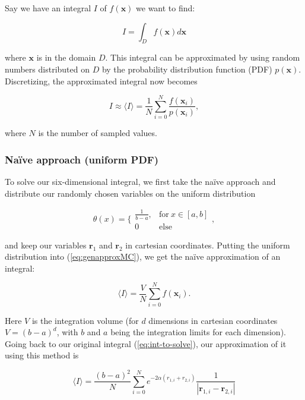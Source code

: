 \documentclass[../main.tex]{subfiles}
\begin{document}
Say we have an integral $I$ of $f(\mathbf x)$ we want to find:

\begin{equation*}
  I=\int_D f(\mathbf x)d\mathbf x
\end{equation*}

where $\mathbf{x}$ is in the domain $D$. This integral can be approximated by using random numbers distributed on $D$ by the probability distribution function (PDF) $p(\mathbf x)$. Discretizing, the approximated integral now becomes

\begin{equation}
  I \approx \langle I \rangle = \frac{1}{N}\sum_{i=0}^N\frac{f(\mathbf x_i)}{p(\mathbf x_i)},
  \label{eq:genapproxMC}
\end{equation}

where  $N$ is the number of sampled values.

\subsubsection{Naïve approach (uniform PDF)} \label{sec:naiveMC}
To solve our six-dimensional integral, we first take the naïve approach and distribute our randomly chosen variables on the uniform distribution

\begin{equation*}
  \theta (x) = \bigg\{ \begin{matrix}\frac{1}{b-a}, & \text{for}\ x\in[a,b] \\ 0 & \text{else}\end{matrix},
\end{equation*}

and keep our variables $\mathbf r_1$ and $\mathbf r_2$ in cartesian coordinates. Putting the uniform distribution into (\ref{eq:genapproxMC}), we get the naïve approximation of an integral:

\begin{equation}
  \langle I\rangle = \frac{V}{N}\sum_{i=0}^Nf(\mathbf x_i).
\end{equation}

Here $V$ is the integration volume (for $d$ dimensions in cartesian coordinates $V=(b-a)^d$, with $b$ and $a$ being the integration limits for each dimension). Going back to our original integral (\ref{eq:int-to-solve}), our approximation of it using this method is

\begin{equation}
  \langle I \rangle = \frac{(b-a)^2}{N}\sum_{i=0}^Ne^{-2\alpha(r_{1,i}+r_{2,i})}\frac{1}{|\mathbf r_{1,i}-\mathbf r_{2,i}|}
  \label{eq:naive-approx}
\end{equation}
\end{document}
